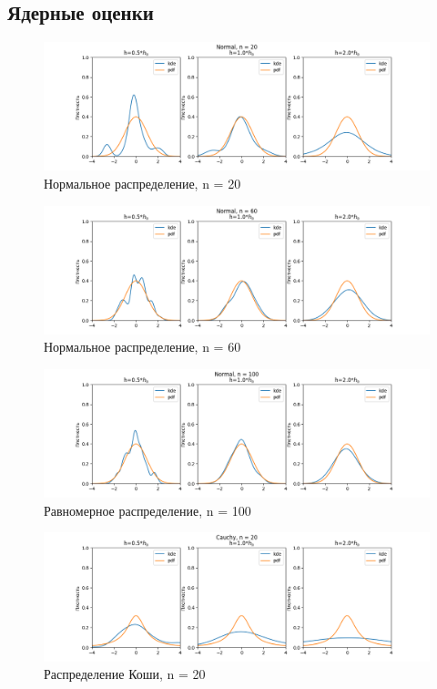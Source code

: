 \documentclass[12pt]{article}
\begin{document}
\subsection{Ядерные оценки}
\begin{figure}[h!]
  \centering
  \includegraphics[width=0.8\paperwidth ]{../images/kde/Normal_20.png}
  \caption{Нормальное распределение, n = 20}
\end{figure}

\begin{figure}[h!]
  \centering
  \includegraphics[width=0.8\paperwidth ]{../images/kde/Normal_60.png}
  \caption{Нормальное распределение, n = 60}
\end{figure}

\begin{figure}[ht]
  \centering
  \includegraphics[width=0.8\paperwidth ]{../images/kde/Normal_100.png}
  \caption{Равномерное распределение, n = 100}
\end{figure}

\begin{figure}
  \centering
  \includegraphics[width=0.8\paperwidth ]{../images/kde/Cauchy_20.png}
  \caption{Распределение Коши, n = 20}
\end{figure}
\end{document}
